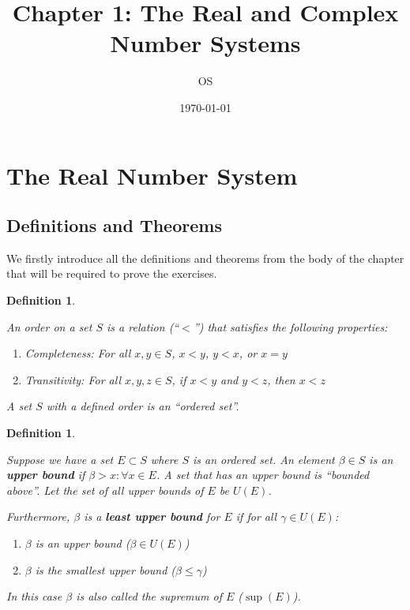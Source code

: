 \documentclass[12pt]{article}
\title{Chapter 1: The Real and Complex Number Systems}
\author{OS}
\date\today
\newtheorem{definition}[theorem]{Definition}
\begin{document}
\maketitle %

\section{The Real Number System}

\subsection{Definitions and Theorems}

We firstly introduce all the definitions and theorems from the body of the chapter that will be required to prove the exercises.

\begin{definition}
    
    \label{order}
    
    An order on a set $S$ is a relation (``$<$'') that satisfies the following properties:
    
    \begin{enumerate}
        \item Completeness: For all $x, y \in S$, $x < y$, $y < x$, or $x = y$
        \item Transitivity: For all $x, y, z \in S$, if $x < y$ and $y < z$, then $x < z$
    \end{enumerate}
    
    A set $S$ with a defined order is an ``ordered set''.
    
\end{definition}

\begin{definition}

    \label{bound}

    Suppose we have a set $E \subset S$ where $S$ is an ordered set. An element $\beta \in S$ is an \textbf{upper bound} if $\beta > x: \forall x \in E$. A set that has an upper bound is ``bounded above''. Let the set of all upper bounds of $E$ be $U(E)$.
    
    Furthermore, $\beta$ is a \textbf{least upper bound} for $E$ if for all $\gamma \in U(E)$:
    
    \begin{enumerate}
        \item $\beta$ is an upper bound ($\beta \in U(E)$)
        \item $\beta$ is the smallest upper bound ($\beta \leq \gamma$)
    \end{enumerate}
    
    In this case $\beta$ is also called the supremum of $E$ ($\sup(E)$).
    
\end{definition}
\end{document}
